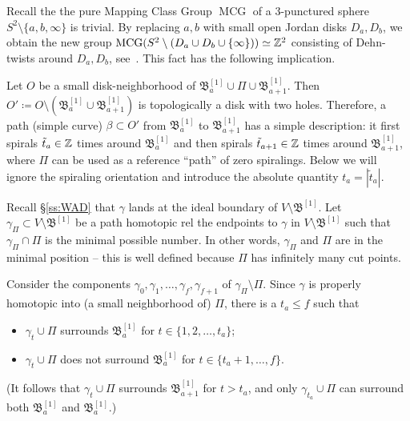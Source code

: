\documentclass{amsart}
\newcommand{\bush}{{\mathfrak B }}
\newcommand{\bbush}{{\boldsymbol {\mathfrak B} }}
\newcommand{\1}{{\mathbb 1 }}
\begin{document}
\begin{rem}
Recall the the pure Mapping Class Group $\operatorname{MCG}$ of a $3$-punctured sphere $S^2\setminus \{a,b,\infty\}$ is trivial. By replacing $a,b$ with small open Jordan disks $D_a,D_b$, we obtain the new group $\operatorname{MCG}(S^2\setminus (D_a\cup D_b\cup \{\infty\}))\simeq {\Bbb Z}^2$ consisting of Dehn-twists around $D_a,D_b$, see~\cite{MCG}. This fact has the following implication.

Let $O$ be a small disk-neighborhood of $\bush^{[1]}_a\cup \Pi \cup \bush^{[1]}_{a+1}$. Then $O'\coloneqq O\setminus (\bush^{[1]}_a\cup \bush^{[1]}_{a+1})$ is topologically a disk with two holes. Therefore, a path (simple curve) $\beta \subset O'$ from $\bush^{[1]}_a$ to $\bush^{[1]}_{a+1}$ has a simple description: it first spirals $\tilde t_a\in {\Bbb Z}$ times around $\bush^{[1]}_a$ and then spirals $\tilde t_{a+1}\in {\Bbb Z}$ times around $\bush^{[1]}_{a+1}$, where $\Pi$ can be used as a reference ``path'' of zero spiralings. Below we will ignore the spiraling orientation and introduce the absolute quantity $t_a=|\tilde t_a|$.
\end{rem}

Recall \S\ref{ss:WAD} that $\gamma$ lands at the ideal boundary of $V\setminus \bbush^{[1]}$. Let $\gamma_\Pi\subset V\setminus \bbush^{[1]}$ be a path homotopic rel the endpoints to $\gamma$ in $V\setminus \bbush^{[1]}$ such that $\gamma_\Pi\cap \Pi$ is the minimal possible number. In other words, $\gamma_\Pi$ and $\Pi$ are in the minimal position -- this is well defined because $\Pi$ has infinitely many cut points. 

Consider the components $\gamma_0,\gamma_1,\dots, \gamma_{f}, \gamma_{f+1}$ of $\gamma_\Pi\setminus \Pi.$  Since $\gamma$ is properly homotopic into (a small neighborhood of) $\Pi$, there is a $t_a\le f$ such that
\begin{itemize}
\item $\gamma_t\cup \Pi$ surrounds $\bush^{[1]}_a$ for $t\in \{1,2,\dots, t_a\}$;
\item $\gamma_t\cup \Pi$ does not surround $\bush^{[1]}_{a}$ for $t\in \{t_a+1,\dots ,f\}$.
\end{itemize}
(It follows that $\gamma_t\cup \Pi$ surrounds $\bush^{[1]}_{a+1}$ for $t>t_a$, and only $\gamma_{t_a}\cup \Pi$ can surround both $\bush^{[1]}_a$ and $\bush^{[1]}_{a}$.) 
\end{document}
